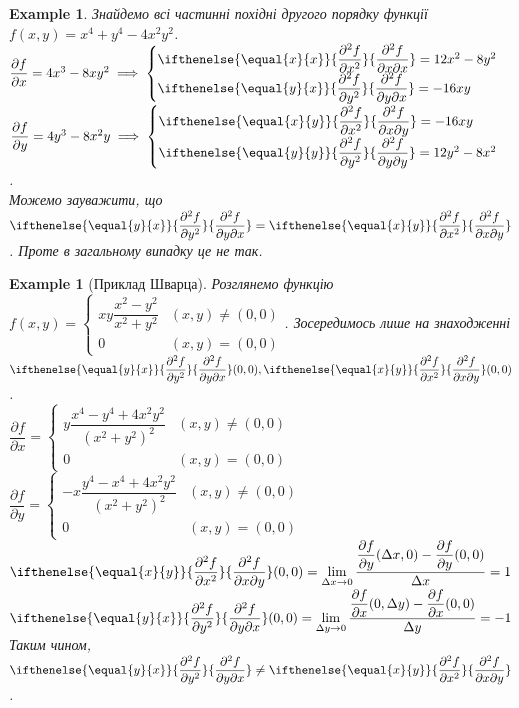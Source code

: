 \documentclass[a4paper, 10pt]{article}
\def\departial#1#2{\dfrac{\partial {#1}}{\partial {#2}}}
\def\seconddepartial#1#2#3{\ifthenelse{\equal{#2}{#3}}{\dfrac{\partial^2 {#1}}{\partial {#2}^2}}{\dfrac{\partial^2 {#1}}{\partial {#2} \partial {#3}}}}
\def\huge{\displaystyle}
\theoremstyle{theoremdd}
\theoremstyle{theoremdd}
\theoremstyle{theoremdd}
\theoremstyle{theoremdd}
\theoremstyle{theoremdd}
\newtheorem{example}[theorem]{Example}
\theoremstyle{theoremdd}
\theoremstyle{theoremdd}
\theoremstyle{theoremdd}
\theoremstyle{theoremdd}
\begin{document}
\begin{example}
Знайдемо всі частинні похідні другого порядку функції $f(x,y) = x^4+y^4-4x^2y^2$.\\
$\departial{f}{x} = 4x^3 - 8xy^2 \implies \begin{cases} \seconddepartial{f}{x}{x} = 12x^2 - 8y^2 \\ \seconddepartial{f}{y}{x} = -16xy \end{cases}$ \hspace{1cm} $\departial{f}{y} = 4y^3 - 8x^2y \implies \begin{cases} \seconddepartial{f}{x}{y} = -16xy \\ \seconddepartial{f}{y}{y} = 12y^2-8x^2 \end{cases}$.\\
Можемо зауважити, що $\seconddepartial{f}{y}{x} = \seconddepartial{f}{x}{y}$. Проте в загальному випадку це не так.
\end{example}

\begin{example}[Приклад Шварца]
Розглянемо функцію $f(x,y) = \begin{cases} xy \dfrac{x^2-y^2}{x^2+y^2} & (x,y) \neq (0,0) \\ 0 & (x,y) = (0,0) \end{cases}$. Зосередимось лише на знаходженні $\seconddepartial{f}{y}{x}(0,0), \seconddepartial{f}{x}{y}(0,0)$.\\
$\departial{f}{x} = \begin{cases} y\dfrac{x^4-y^4+4x^2y^2}{(x^2+y^2)^2} & (x,y) \neq (0,0) \\ 0 & (x,y) = (0,0) \end{cases}$ \hspace{1cm} $\departial{f}{y} = \begin{cases} -x\dfrac{y^4-x^4+4x^2y^2}{(x^2+y^2)^2} & (x,y) \neq (0,0) \\ 0 & (x,y) = (0,0) \end{cases}$\\
$\seconddepartial{f}{x}{y}(0,0) = \huge\lim_{\Delta x \to 0} \dfrac{\departial{f}{y}(\Delta x, 0) - \departial{f}{y}(0,0)}{\Delta x} = 1$ \hspace{1cm} $\seconddepartial{f}{y}{x}(0,0) = \huge\lim_{\Delta y \to 0} \dfrac{\departial{f}{x}(0, \Delta y) - \departial{f}{x}(0,0)}{\Delta y} = -1$\\
Таким чином, $\seconddepartial{f}{y}{x} \neq \seconddepartial{f}{x}{y}$.
\end{example}
\end{document}
